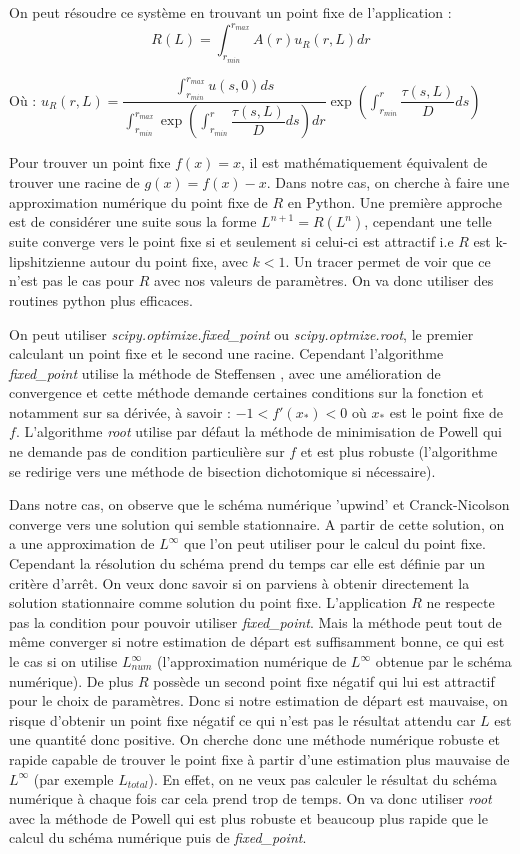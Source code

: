 \documentclass[a4paper,fleqn,leqno]{article}
\newcommand{\bint}{\displaystyle\int}
\begin{document}
On peut résoudre ce système en trouvant un point fixe de l'application : 
\[R(L) = \bint^{r_{max}}_{r_{min}} A(r)u_R(r,L)dr\]

Où : $u_R(r,L) = \dfrac{\bint^{r_{max}}_{r_{min}} u(s,0) ds}{\displaystyle\int^{r_{max}}_{r_{min}} \exp\left(\bint^r_{r_{min}} \dfrac{\tau(s,L)}{D}ds\right)dr} \exp\left(\bint^r_{r_{min}} \dfrac{\tau(s,L)}{D}ds\right)$


Pour trouver un point fixe $f(x) = x$, il est mathématiquement équivalent de trouver une racine de $g(x) = f(x) - x$. Dans notre cas, on cherche à faire une approximation numérique du point fixe de $R$ en Python. Une première approche est de considérer une suite sous la forme $L^{n+1} = R(L^n)$, cependant une telle suite converge vers le point fixe si et seulement si celui-ci est attractif i.e $R$ est k-lipshitzienne autour du point fixe, avec $k<1$. Un tracer permet de voir que ce n'est pas le cas pour $R$ avec nos valeurs de paramètres. On va donc utiliser des routines python plus efficaces.

On peut utiliser \textit{scipy.optimize.fixed\_point} ou \textit{scipy.optmize.root}, le premier calculant un point fixe et le second une racine. Cependant l'algorithme \textit{fixed\_point} utilise la méthode de Steffensen \cite{Numerical_analysis}, avec une amélioration de convergence et cette méthode demande certaines conditions sur la fonction et notamment sur sa dérivée, à savoir : $-1 < f'(x_*) < 0$ où $x_*$ est le point fixe de $f$. L'algorithme \textit{root} utilise par défaut la méthode de minimisation de Powell qui ne demande pas de condition particulière sur $f$ et est plus robuste (l'algorithme se redirige vers une méthode de bisection dichotomique si nécessaire)\cite{Scipy}\cite{Root}\cite{Powell1970}.

Dans notre cas, on observe que le schéma numérique 'upwind' et Cranck-Nicolson converge vers une solution qui semble stationnaire. A partir de cette solution, on a une approximation de $L^{\infty}$ que l'on peut utiliser pour le calcul du point fixe. Cependant la résolution du schéma prend du temps car elle est définie par un critère d'arrêt. On veux donc savoir si on parviens à obtenir directement la solution stationnaire comme solution du point fixe.
L'application $R$ ne respecte pas la condition pour pouvoir utiliser \textit{fixed\_point}. Mais la méthode peut tout de même converger si notre estimation de départ est suffisamment bonne, ce qui est le cas si on utilise $L^{\infty}_{num}$ (l'approximation numérique de $L^\infty$ obtenue par le schéma numérique). De plus $R$ possède un second point fixe négatif qui lui est attractif pour le choix de paramètres. Donc si notre estimation de départ est mauvaise, on risque d'obtenir un point fixe négatif ce qui n'est pas le résultat attendu car $L$ est une quantité donc positive. 
On cherche donc une méthode numérique robuste et rapide capable de trouver le point fixe à partir d'une estimation plus mauvaise de $L^{\infty}$ (par exemple $L_{total}$). En effet, on ne veux pas calculer le résultat du schéma numérique à chaque fois car cela prend trop de temps. On va donc utiliser \textit{root} avec la méthode de Powell qui est plus robuste et beaucoup plus rapide que le calcul du schéma numérique puis de \textit{fixed\_point}.
\end{document}
